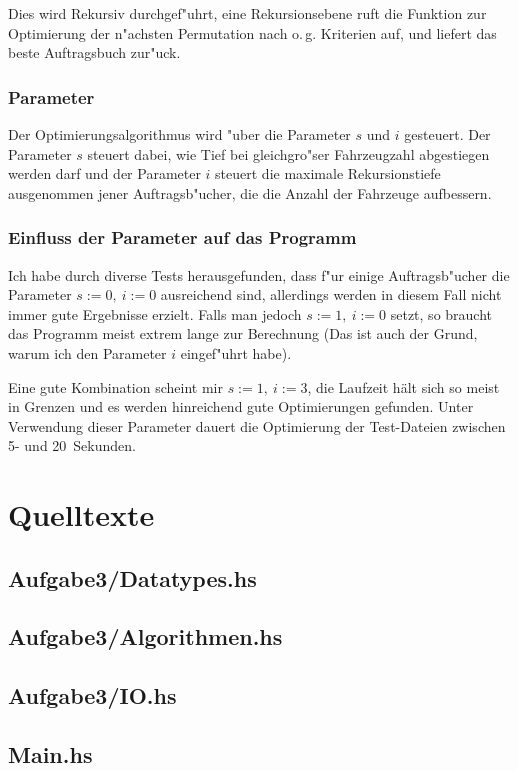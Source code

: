 \documentclass{scrreprt}
\begin{document}
Dies wird Rekursiv durchgef"uhrt, eine Rekursionsebene ruft die Funktion zur
Optimierung der n"achsten Permutation nach o.\,g. Kriterien auf, und liefert das
beste Auftragsbuch zur"uck.

\subsection{Parameter}
Der Optimierungsalgorithmus wird "uber die Parameter $s$ und $i$ gesteuert. Der
Parameter $s$ steuert dabei, wie Tief bei gleichgro"ser Fahrzeugzahl abgestiegen
werden darf und der Parameter $i$ steuert die maximale Rekursionstiefe
ausgenommen jener Auftragsb"ucher, die die Anzahl der Fahrzeuge aufbessern.

\subsection{Einfluss der Parameter auf das Programm}
Ich habe durch diverse Tests herausgefunden, dass f"ur einige Auftragsb"ucher
die Parameter $s := 0,\ i := 0$ ausreichend sind, allerdings werden in diesem
Fall nicht immer gute Ergebnisse erzielt.  Falls man jedoch $s := 1,\ i := 0$
setzt, so braucht das Programm meist extrem lange zur Berechnung (Das ist auch
der Grund, warum ich den Parameter $i$ eingef"uhrt habe).

Eine gute Kombination scheint mir $s := 1,\ i := 3$, die Laufzeit hält sich so
meist in Grenzen und es werden hinreichend gute Optimierungen gefunden.  Unter
Verwendung dieser Parameter dauert die Optimierung der Test-Dateien zwischen 5-
und 20\ Sekunden.

\chapter{Quelltexte}

\section{Aufgabe3/Datatypes.hs}


\section{Aufgabe3/Algorithmen.hs}


\section{Aufgabe3/IO.hs}


\section{Main.hs}

\end{document}
